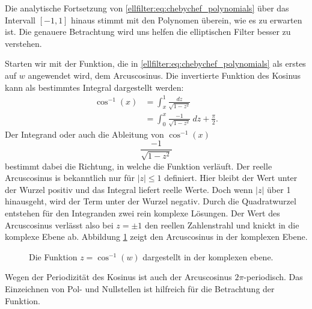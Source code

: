 Die analytische Fortsetzung von \eqref{ellfilter:eq:chebychef_polynomials} über das Intervall $[-1,1]$ hinaus stimmt mit den Polynomen überein, wie es zu erwarten ist.
Die genauere Betrachtung wird uns helfen die elliptischen Filter besser zu verstehen.

Starten wir mit der Funktion, die in \eqref{ellfilter:eq:chebychef_polynomials} als erstes auf $w$ angewendet wird, dem Arcuscosinus.
Die invertierte Funktion des Kosinus kann als bestimmtes Integral dargestellt werden:
\begin{align}
    \cos^{-1}(x)
    &=
    \int_{x}^{1}
    \frac{
        dz
    }{
        \sqrt{
            1-z^2
        }
    }\\
    &=
    \int_{0}^{x}
    \frac{
        -1
    }{
        \sqrt{
            1-z^2
        }
    }
    ~dz
    + \frac{\pi}{2}.
\end{align}
Der Integrand oder auch die Ableitung von $\cos^{-1}(x)$
\begin{equation}
    \frac{
        -1
    }{
        \sqrt{
            1-z^2
        }
    }
\end{equation}
bestimmt dabei die Richtung, in welche die Funktion verläuft.
Der reelle Arcuscosinus is bekanntlich nur für $|z| \leq 1$ definiert.
Hier bleibt der Wert unter der Wurzel positiv und das Integral liefert reelle Werte.
Doch wenn $|z|$ über 1 hinausgeht, wird der Term unter der Wurzel negativ.
Durch die Quadratwurzel entstehen für den Integranden zwei rein komplexe Lösungen.
Der Wert des Arcuscosinus verlässt also bei $z= \pm 1$ den reellen Zahlenstrahl und knickt in die komplexe Ebene ab.
Abbildung \ref{ellfilter:fig:arccos} zeigt den Arcuscosinus in der komplexen Ebene.
\begin{figure}
    \centering
    
    \caption{Die Funktion $z = \cos^{-1}(w)$ dargestellt in der komplexen ebene.}
    \label{ellfilter:fig:arccos}
\end{figure}
Wegen der Periodizität des Kosinus ist auch der Arcuscosinus $2\pi$-periodisch.
Das Einzeichnen von Pol- und Nullstellen ist hilfreich für die Betrachtung der Funktion.


